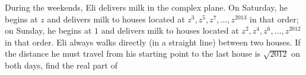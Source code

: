 During the weekends, Eli delivers milk in the complex plane. On Saturday, he begins at $z$ and delivers milk to houses located at $z^3,z^5,z^7,\ldots,z^{2013}$ in that order; on Sunday, he begins at $1$ and delivers milk to houses located at $z^2,z^4,z^6,\ldots,z^{2012}$ in that order.  Eli always walks directly (in a straight line) between two houses. If the distance he must travel from his starting point to the last house is $\sqrt{2012}$ on both days, find the real part of 